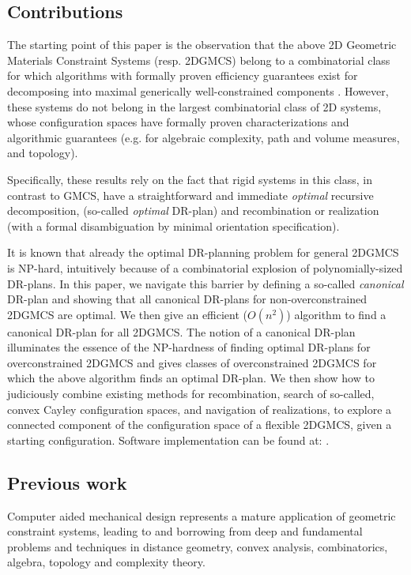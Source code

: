 \subsection{Contributions}

The starting point of this paper is the observation that the above 2D Geometric Materials Constraint Systems (resp. 2DGMCS) belong to a combinatorial class for which algorithms with formally proven efficiency guarantees exist for  decomposing into maximal generically well-constrained components . However, these systems do not belong in the largest combinatorial class of 2D systems, whose configuration spaces have formally proven  characterizations and algorithmic guarantees (e.g. for algebraic complexity, path and volume measures, and  topology).

Specifically, these results  rely on the fact that rigid systems in this  class, in contrast to GMCS, have a straightforward and immediate {\sl optimal} recursive decomposition, (so-called {\sl optimal} DR-plan) and  recombination or realization (with a formal disambiguation by minimal orientation specification).

It is known  that already the optimal DR-planning problem for general 2DGMCS is NP-hard, intuitively because of a combinatorial explosion of polynomially-sized DR-plans.  In this paper, we  navigate this barrier by defining a so-called {\it canonical} DR-plan and showing that all canonical DR-plans for non-overconstrained 2DGMCS are optimal. We then give an efficient ($O(n^2)$) algorithm to find a canonical DR-plan for all 2DGMCS. The notion of a canonical DR-plan illuminates the essence of the NP-hardness of finding optimal DR-plans for overconstrained 2DGMCS and gives classes of overconstrained 2DGMCS for which the above  algorithm finds an optimal DR-plan. We then show how to judiciously combine existing methods for recombination, search of so-called, convex Cayley configuration spaces, and navigation of realizations, to explore a connected component of the configuration space of a flexible 2DGMCS, given a starting configuration. Software implementation can be found at: .


\subsection{Previous work}

Computer aided mechanical design represents a mature application of geometric constraint systems,  leading to and borrowing from deep and fundamental problems and techniques in distance geometry, convex analysis, combinatorics, algebra, topology and complexity theory.

